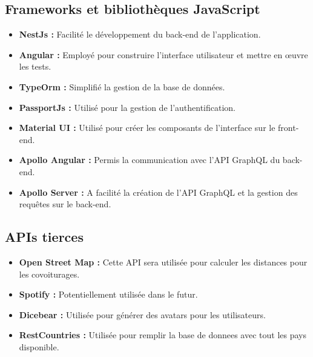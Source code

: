 \subsection{Frameworks et bibliothèques JavaScript}\label{subsec:frameworks}
\begin{itemize}
    \item \textbf{NestJs :} Facilité le développement du back-end de l'application.
    \item \textbf{Angular :} Employé pour construire l'interface utilisateur et mettre en œuvre les tests.
    \item \textbf{TypeOrm :} Simplifié la gestion de la base de données.
    \item \textbf{PassportJs :} Utilisé pour la gestion de l'authentification.
    \item \textbf{Material UI :} Utilisé pour créer les composants de l'interface sur le front-end.
    \item \textbf{Apollo Angular :} Permis la communication avec l'API GraphQL du back-end.
    \item \textbf{Apollo Server :} A facilité la création de l'API GraphQL et la gestion des requêtes sur le back-end.
\end{itemize}

\subsection{APIs tierces}\label{subsec:apis-tierces}
\begin{itemize}
    \item \textbf{Open Street Map :} Cette API sera utilisée pour calculer les distances pour les covoiturages.
    \item \textbf{Spotify :} Potentiellement utilisée dans le futur.
    \item \textbf{Dicebear :} Utilisée pour générer des avatars pour les utilisateurs.
    \item \textbf{RestCountries :} Utilisée pour remplir la base de donnees avec tout les pays disponible.
\end{itemize}

